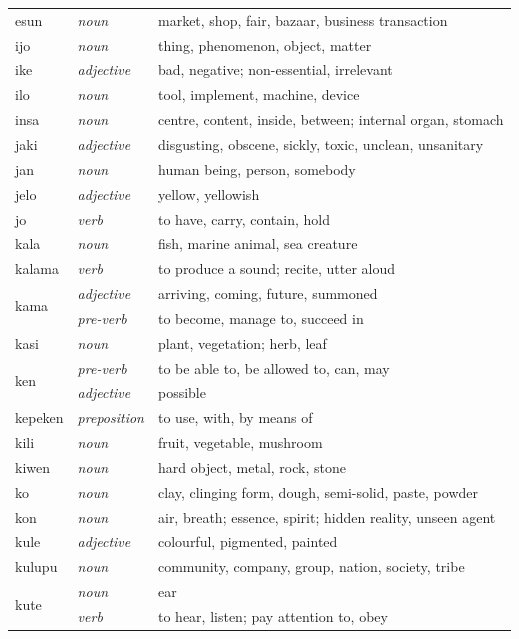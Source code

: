 \documentclass[14pt, a4paper]{extreport}
\begin{document}
\begin{longtable}{llp{10cm}}
  esun & \textit{noun} & market, shop, fair, bazaar, business transaction \\
  ijo & \textit{noun} & thing, phenomenon, object, matter \\
  ike & \textit{adjective} & bad, negative; non-essential, irrelevant \\
  ilo & \textit{noun} & tool, implement, machine, device \\
  insa & \textit{noun} & centre, content, inside, between; internal organ, stomach \\
  jaki & \textit{adjective} & disgusting, obscene, sickly, toxic, unclean, unsanitary \\
  jan & \textit{noun} & human being, person, somebody \\
  jelo & \textit{adjective} & yellow, yellowish \\
  jo & \textit{verb} & to have, carry, contain, hold \\
  kala & \textit{noun} & fish, marine animal, sea creature \\
  kalama & \textit{verb} & to produce a sound; recite, utter aloud \\
  \multirow[t]{2}{*}{kama} & \textit{adjective} & arriving, coming, future, summoned \\
  & \textit{pre-verb} & to become, manage to, succeed in \\
  kasi & \textit{noun} & plant, vegetation; herb, leaf \\
  \multirow[t]{2}{*}{ken} & \textit{pre-verb} & to be able to, be allowed to, can, may \\
  & \textit{adjective} & possible \\
  kepeken & \textit{preposition} & to use, with, by means of \\
  kili & \textit{noun} & fruit, vegetable, mushroom \\
  kiwen & \textit{noun} & hard object, metal, rock, stone \\
  ko & \textit{noun} & clay, clinging form, dough, semi-solid, paste, powder \\
  kon & \textit{noun} & air, breath; essence, spirit; hidden reality, unseen agent \\
  kule & \textit{adjective} & colourful, pigmented, painted \\
  kulupu & \textit{noun} & community, company, group, nation, society, tribe \\
  \multirow[t]{2}{*}{kute} & \textit{noun} & ear \\
  & \textit{verb} & to hear, listen; pay attention to, obey \\

\end{longtable}
\end{document}
